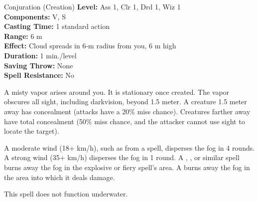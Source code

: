 {Conjuration (Creation)}
{
	\textbf{Level:}
	Ass 1, Clr 1, Drd 1, Wiz 1\\
	\textbf{Components:}
	V, S\\
	\textbf{Casting Time:}
	1 standard action\\
	\textbf{Range:}
	6 m\\
	\textbf{Effect:}
	Cloud spreads in 6-m radius from you, 6 m high\\
	\textbf{Duration:}
	1 min./level\\
	\textbf{Saving Throw:}
	None\\
	\textbf{Spell Resistance:}
	No\\
}
{
	A misty vapor arises around you. It is stationary once created. The vapor obscures all sight, including darkvision, beyond 1.5 meter. A creature 1.5 meter away has concealment (attacks have a 20\% miss chance). Creatures farther away have total concealment (50\% miss chance, and the attacker cannot use sight to locate the target).

	A moderate wind (18+ km/h), such as from a  spell, disperses the fog in 4 rounds. A strong wind (35+ km/h) disperses the fog in 1 round. A , , or similar spell burns away the fog in the explosive or fiery spell's area. A  burns away the fog in the area into which it deals damage.

	This spell does not function underwater.

}
